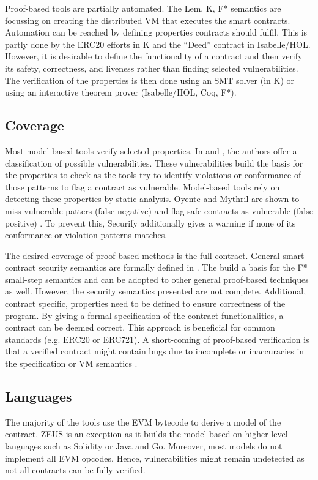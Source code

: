Proof-based tools are partially automated. The Lem, K, F* semantics are focussing on creating the distributed VM that executes the smart contracts. Automation can be reached by defining properties contracts should fulfil. This is partly done by the ERC20 efforts in K and the ``Deed'' contract in Isabelle/HOL. However, it is desirable to define the functionality of a contract and then verify its safety, correctness, and liveness rather than finding selected vulnerabilities. The verification of the properties is then done using an SMT solver (in K) or using an interactive theorem prover (Isabelle/HOL, Coq, F*).

\subsection{Coverage} Most model-based tools verify selected properties. In \cite{Atzei2017} and \cite{Luu2016}, the authors offer a classification of possible vulnerabilities. These vulnerabilities build the basis for the properties to check as the tools try to identify violations or conformance of those patterns to flag a contract as vulnerable.
Model-based tools rely on detecting these properties by static analysis. 
Oyente and Mythril are shown to miss vulnerable patters (false negative) and flag safe contracts as vulnerable (false positive) \cite{Tsankov2017}.
To prevent this, Securify additionally gives a warning if none of its conformance or violation patterns matches.

The desired coverage of proof-based methods is the full contract. 
General smart contract security semantics are formally defined in \cite{Grishchenko2018}. The build a basis for the F* small-step semantics and can be adopted to other general proof-based techniques as well.
However, the security semantics presented are not complete.
Additional, contract specific, properties need to be defined to ensure correctness of the program.
By giving a formal specification of the contract functionalities, a contract can be deemed correct. This approach is beneficial for common standards (e.g. ERC20 or ERC721). A short-coming of proof-based verification is that a verified contract might contain bugs due to incomplete or inaccuracies in the specification or VM semantics \cite{Hirai2016}.

\subsection{Languages} 
The majority of the tools use the EVM bytecode to derive a model of the contract. ZEUS is an exception as it builds the model based on higher-level languages such as Solidity or Java and Go. Moreover, most models do not implement all EVM opcodes. Hence, vulnerabilities might remain undetected as not all contracts can be fully verified.

